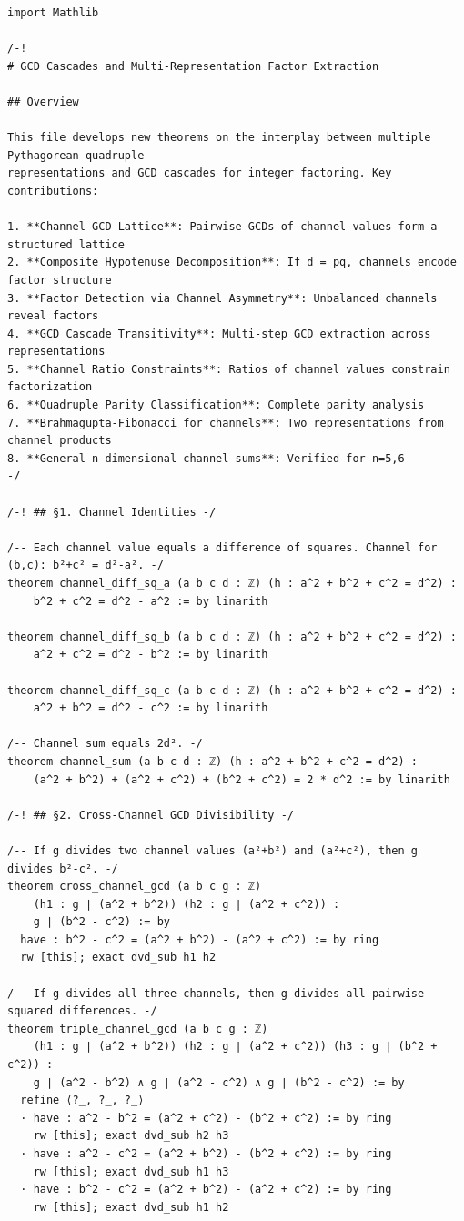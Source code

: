 \documentclass[11pt,openany]{book}
\theoremstyle{definition}
\theoremstyle{plain}
\theoremstyle{remark}
\begin{document}
\begin{lstlisting}[style=lean]
import Mathlib

/-!
# GCD Cascades and Multi-Representation Factor Extraction

## Overview

This file develops new theorems on the interplay between multiple Pythagorean quadruple
representations and GCD cascades for integer factoring. Key contributions:

1. **Channel GCD Lattice**: Pairwise GCDs of channel values form a structured lattice
2. **Composite Hypotenuse Decomposition**: If d = pq, channels encode factor structure
3. **Factor Detection via Channel Asymmetry**: Unbalanced channels reveal factors
4. **GCD Cascade Transitivity**: Multi-step GCD extraction across representations
5. **Channel Ratio Constraints**: Ratios of channel values constrain factorization
6. **Quadruple Parity Classification**: Complete parity analysis
7. **Brahmagupta-Fibonacci for channels**: Two representations from channel products
8. **General n-dimensional channel sums**: Verified for n=5,6
-/

/-! ## §1. Channel Identities -/

/-- Each channel value equals a difference of squares. Channel for (b,c): b²+c² = d²-a². -/
theorem channel_diff_sq_a (a b c d : ℤ) (h : a^2 + b^2 + c^2 = d^2) :
    b^2 + c^2 = d^2 - a^2 := by linarith

theorem channel_diff_sq_b (a b c d : ℤ) (h : a^2 + b^2 + c^2 = d^2) :
    a^2 + c^2 = d^2 - b^2 := by linarith

theorem channel_diff_sq_c (a b c d : ℤ) (h : a^2 + b^2 + c^2 = d^2) :
    a^2 + b^2 = d^2 - c^2 := by linarith

/-- Channel sum equals 2d². -/
theorem channel_sum (a b c d : ℤ) (h : a^2 + b^2 + c^2 = d^2) :
    (a^2 + b^2) + (a^2 + c^2) + (b^2 + c^2) = 2 * d^2 := by linarith

/-! ## §2. Cross-Channel GCD Divisibility -/

/-- If g divides two channel values (a²+b²) and (a²+c²), then g divides b²-c². -/
theorem cross_channel_gcd (a b c g : ℤ)
    (h1 : g ∣ (a^2 + b^2)) (h2 : g ∣ (a^2 + c^2)) :
    g ∣ (b^2 - c^2) := by
  have : b^2 - c^2 = (a^2 + b^2) - (a^2 + c^2) := by ring
  rw [this]; exact dvd_sub h1 h2

/-- If g divides all three channels, then g divides all pairwise squared differences. -/
theorem triple_channel_gcd (a b c g : ℤ)
    (h1 : g ∣ (a^2 + b^2)) (h2 : g ∣ (a^2 + c^2)) (h3 : g ∣ (b^2 + c^2)) :
    g ∣ (a^2 - b^2) ∧ g ∣ (a^2 - c^2) ∧ g ∣ (b^2 - c^2) := by
  refine ⟨?_, ?_, ?_⟩
  · have : a^2 - b^2 = (a^2 + c^2) - (b^2 + c^2) := by ring
    rw [this]; exact dvd_sub h2 h3
  · have : a^2 - c^2 = (a^2 + b^2) - (b^2 + c^2) := by ring
    rw [this]; exact dvd_sub h1 h3
  · have : b^2 - c^2 = (a^2 + b^2) - (a^2 + c^2) := by ring
    rw [this]; exact dvd_sub h1 h2


\end{lstlisting}
\end{document}
